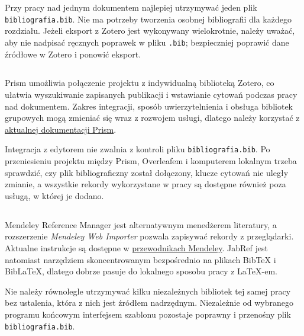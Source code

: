 Przy pracy nad jednym dokumentem najlepiej utrzymywać jeden plik \texttt{bibliografia.bib}. Nie ma potrzeby tworzenia osobnej bibliografii dla każdego rozdziału. Jeżeli eksport z Zotero jest wykonywany wielokrotnie, należy uważać, aby nie nadpisać ręcznych poprawek w pliku \texttt{.bib}; bezpieczniej poprawić dane źródłowe w Zotero i ponowić eksport.

\subsection{}

Prism umożliwia połączenie projektu z indywidualną biblioteką Zotero, co ułatwia wyszukiwanie zapisanych publikacji i wstawianie cytowań podczas pracy nad dokumentem. Zakres integracji, sposób uwierzytelnienia i obsługa bibliotek grupowych mogą zmieniać się wraz z rozwojem usługi, dlatego należy korzystać z \href{https://help.openai.com/en/articles/20001050-troubleshooting-and-getting-help-in-prism}{aktualnej dokumentacji Prism}.

Integracja z edytorem nie zwalnia z kontroli pliku \texttt{bibliografia.bib}. Po przeniesieniu projektu między Prism, Overleafem i komputerem lokalnym trzeba sprawdzić, czy plik bibliograficzny został dołączony, klucze cytowań nie uległy zmianie, a wszystkie rekordy wykorzystane w pracy są dostępne również poza usługą, w której je dodano.

\subsection{}

Mendeley Reference Manager jest alternatywnym menedżerem literatury, a rozszerzenie \emph{Mendeley Web Importer} pozwala zapisywać rekordy z przeglądarki. Aktualne instrukcje są dostępne w \href{https://www.mendeley.com/guides}{przewodnikach Mendeley}. JabRef jest natomiast narzędziem skoncentrowanym bezpośrednio na plikach BibTeX i BibLaTeX, dlatego dobrze pasuje do lokalnego sposobu pracy z LaTeX-em.

Nie należy równolegle utrzymywać kilku niezależnych bibliotek tej samej pracy bez ustalenia, która z nich jest źródłem nadrzędnym. Niezależnie od wybranego programu końcowym interfejsem szablonu pozostaje poprawny i przenośny plik \texttt{bibliografia.bib}.

\subsection{}

